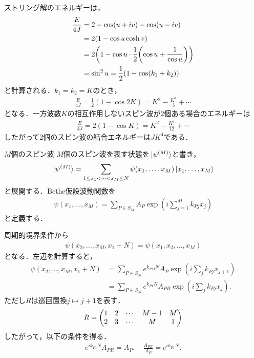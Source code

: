 \documentclass[\main/main.tex]{subfiles}
\begin{document}
\begin{frame}
    ストリング解のエネルギーは，
    \begin{align}
        \frac{E}{4J} &\nonumber
        = 2 - \cos(u+iv)-\cos(u-iv) 
        \\ &\nonumber
        = 2(1-\cos u \cosh v)
        \\ &\nonumber
        = 2\qty(1- \cos u \cdot \frac{1}{2}\qty(\cos u + \frac{1}{\cos u}))
        \\ &
        = \sin^2 u
        = \frac{1}{2}(1-\cos (k_1+k_2))
    \end{align}
    と計算される．$k_1 = k_2 = K$のとき，
    \begin{align}
        \frac{E}{4J} = \frac{1}{2}(1-\cos 2K) = K^2 - \frac{K^4}{3} + \cdots
    \end{align}
    となる．一方波数$K$の相互作用しないスピン波が2個ある場合のエネルギーは
    \begin{align}
        \frac{E}{4J} = 2(1- \cos K) = K^2 - \frac{K^4}{12} + \cdots
    \end{align}
    したがって2個のスピン波の結合エネルギーは$JK^4$である．
\end{frame}

\begin{frame}{$M$個のスピン波}
    $M$個のスピン波を表す状態を$\ket*{\psi^{(M)}}$と書き，
    \begin{align}
        \ket*{\psi^{(M)}} = \sum_{1\le x_1 < \cdots < x_M \le N}  \psi(x_1,\ldots,x_M) \ket{x_1,\ldots,x_M}
    \end{align}
    と展開する．Bethe仮設波動関数を
    \begin{align}
        \psi(x_1,\ldots,x_M) = \sum_{P \in S_M} A_P \exp(i \sum_{j=1}^M k_{Pj} x_j)
    \end{align}
    と定義する．
\end{frame}

\begin{frame}
    周期的境界条件から
    \begin{align}
        \psi(x_2,\ldots,x_M,x_1+N) = \psi(x_1,x_2,\ldots,x_M)
    \end{align}
    となる．左辺を計算すると，
    \begin{align}
        \psi(x_2,\ldots,x_M,x_1+N)
        &
        = \sum_{P \in S_M} e^{k_{PM}N} A_P \exp(i \sum_j k_{Pj}x_{j+1})
        \\ &
        = \sum_{P \in S_M} e^{k_{P1}N} A_{PR} \exp(i \sum_j k_{Pj}x_j).
    \end{align}
    ただし$R$は巡回置換$j \mapsto j+1$を表す．
    \begin{align}
        R = \mqty(1&2&\cdots&M-1&M \\ 2&3&\cdots&M&1)
    \end{align}
    したがって，以下の条件を得る．
    \begin{align}
        e^{i k_{P1}N}A_{PR} = A_P,
        \quad
        \frac{A_{PR}}{A_P} = e^{i k_{P1}N}.
        \label{Bethe Ansatz: periodic boundary condition}
    \end{align}
\end{frame}
\end{document}
